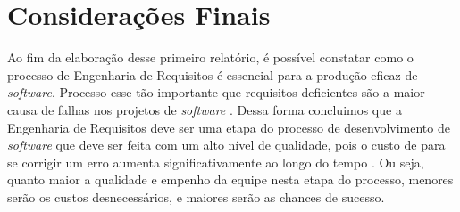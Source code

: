 \chapter[Considerações Finais]{Considerações Finais}
Ao fim da elaboração desse primeiro relatório, é possível constatar como o processo de Engenharia de Requisitos é essencial para a produção eficaz de \emph{software}. Processo esse tão importante que requisitos deficientes são a maior causa de falhas nos projetos de \emph{software} \cite{hofmann001}. Dessa forma concluimos que a Engenharia de Requisitos deve ser uma etapa do processo de desenvolvimento de \emph{software} que deve ser feita com um alto nível de qualidade, pois o custo de para se corrigir um erro aumenta significativamente ao longo do tempo \cite{boehm001}. Ou seja, quanto maior a qualidade e empenho da equipe nesta etapa do processo, menores serão os custos desnecessários, e maiores serão as chances de sucesso.


